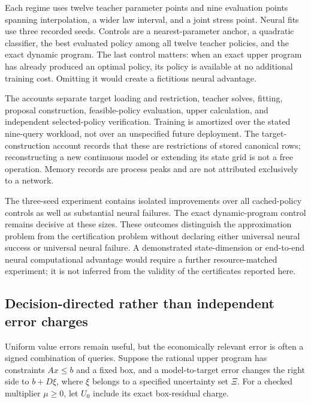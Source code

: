 Each regime uses twelve teacher parameter points and nine evaluation points spanning interpolation, a wider law interval, and a joint stress point. Neural fits use three recorded seeds. Controls are a nearest-parameter anchor, a quadratic classifier, the best evaluated policy among all twelve teacher policies, and the exact dynamic program. The last control matters: when an exact upper program has already produced an optimal policy, its policy is available at no additional training cost. Omitting it would create a fictitious neural advantage.



The accounts separate target loading and restriction, teacher solves, fitting, proposal construction, feasible-policy evaluation, upper calculation, and independent selected-policy verification. Training is amortized over the stated nine-query workload, not over an unspecified future deployment. The target-construction account records that these are restrictions of stored canonical rows; reconstructing a new continuous model or extending its state grid is not a free operation. Memory records are process peaks and are not attributed exclusively to a network.

The three-seed experiment contains isolated improvements over all cached-policy controls as well as substantial neural failures. The exact dynamic-program control remains decisive at these sizes. These outcomes distinguish the approximation problem from the certification problem without declaring either universal neural success or universal neural failure. A demonstrated state-dimension or end-to-end neural computational advantage would require a further resource-matched experiment; it is not inferred from the validity of the certificates reported here.

\subsection{Decision-directed rather than independent error charges}
\label{sec:correlatederrors}
Uniform value errors remain useful, but the economically relevant error is often a signed combination of queries. Suppose the rational upper program has constraints $Ax\leq b$ and a fixed box, and a model-to-target error changes the right side to $b+D\xi$, where $\xi$ belongs to a specified uncertainty set $\Xi$. For a checked multiplier $\mu\geq0$, let $U_0$ include its exact box-residual charge.

